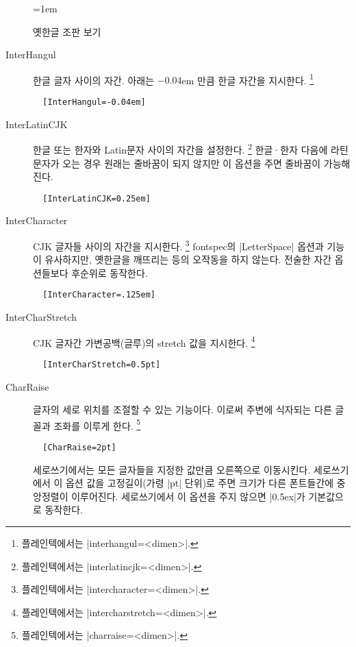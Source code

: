 \documentclass[a4paper]{article}
\begin{document}
\begin{figure}
  \fboxsep=1em
  \fbox{\parbox{\dimexpr\linewidth-2.1em\relax}{\sffamily
  \parindent1em
  \hunmintxt
}}
\caption{옛한글 조판 보기}\label{fig:yethangul}
\end{figure}

\begin{description}
  \item[InterHangul] %
    {한글 글자
    사이의 자간}.  아래는 $-0.04$em 만큼 한글 자간을 지시한다.%
    \footnote{%
      플레인텍에서는 |interhangul=<dimen>|. }
\begin{verbatim}
  [InterHangul=-0.04em]
\end{verbatim}

\item[InterLatinCJK] %
  한글 또는 한자와 Latin문자 사이의 자간을 설정한다.%
    \footnote{%
      플레인텍에서는 |interlatincjk=<dimen>|. }
    한글^^b7한자 다음에 라틴 문자가 오는 경우 원래는 줄바꿈이 되지 않지만
    이 옵션을 주면 줄바꿈이 가능해진다.
\begin{verbatim}
  [InterLatinCJK=0.25em]
\end{verbatim}

\item[InterCharacter] %
  CJK 글자들 사이의 자간을 지시한다.%
  \footnote{%
    플레인텍에서는 |intercharacter=<dimen>|. }
  fontspec의 |LetterSpace| 옵션과 기능이 유사하지만, 옛한글을 깨뜨리는 등의
  오작동을 하지 않는다. 전술한 자간 옵션들보다 후순위로 동작한다.
\begin{verbatim}
  [InterCharacter=.125em]
\end{verbatim}

\item[InterCharStretch] %
  CJK 글자간 가변공백{\small(글루)}의 stretch 값을 지시한다.%
  \footnote{%
    플레인텍에서는 |intercharstretch=<dimen>|. }
\begin{verbatim}
  [InterCharStretch=0.5pt]
\end{verbatim}

\item[CharRaise] %
  글자의 세로 위치를
  { 조절}할 수 있는 기능이다.
  이로써 주변에 식자되는 다른 글꼴과 조화를 이루게 한다.%
  \footnote{%
    플레인텍에서는 |charraise=<dimen>|. }
\begin{verbatim}
  [CharRaise=2pt]
\end{verbatim}
  세로쓰기에서는 모든 글자들을 지정한 값만큼 오른쪽으로 이동시킨다.
  세로쓰기에서 이 옵션 값을 고정길이{\small(가령 |pt| 단위)}로 주면
  크기가 다른 폰트들간에 중앙정렬이 이루어진다.
  세로쓰기에서 이 옵션을 주지 않으면 |0.5ex|가 기본값으로 동작한다.


\end{description}
\end{document}
